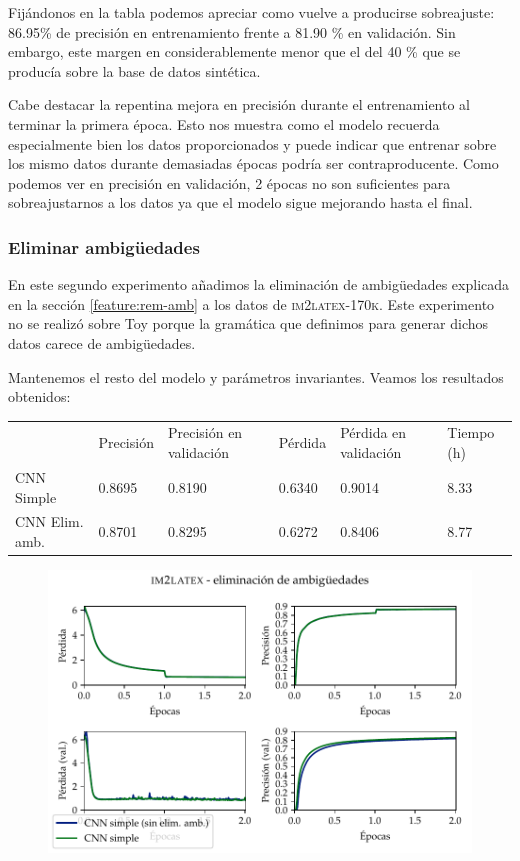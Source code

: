 \documentclass[a4paper, 20pt, dvipsnames]{article}
\begin{document}
Fijándonos en la tabla podemos apreciar como vuelve a producirse sobreajuste:
86.95\% de precisión en entrenamiento frente a 81.90 \% en validación. Sin
embargo, este margen en considerablemente menor que el del 40 \% que se producía
sobre la base de datos sintética.

Cabe destacar la repentina mejora en precisión durante el entrenamiento al
terminar la primera época. Esto nos muestra como el modelo recuerda
especialmente bien los datos proporcionados y puede indicar que entrenar sobre
los mismo datos durante demasiadas épocas podría ser contraproducente. Como
podemos ver en precisión en validación, 2 épocas no son suficientes para
sobreajustarnos a los datos ya que el modelo sigue mejorando hasta el final.

\subsubsection{Eliminar ambigüedades}
\label{exp:2}

En este segundo experimento añadimos la eliminación de ambigüedades explicada en
la sección \ref{feature:rem-amb} a los datos de \textsc{im2latex-170k}. Este experimento no se
realizó sobre Toy porque la gramática que definimos para generar dichos datos
carece de ambigüedades.

Mantenemos el resto del modelo y parámetros invariantes. Veamos los resultados obtenidos:

\begin{table}[H]
	\begin{tabular}{llllll}
		\centering
		& Precisión & Precisión en validación & Pérdida & Pérdida en validación & Tiempo (h) \\ \cline{2-6} 
		CNN Simple       & 0.8695    & 0.8190                  & 0.6340  & 0.9014                & 8.33       \\
		CNN Elim. amb. & 0.8701    & 0.8295                  & 0.6272  & 0.8406                & 8.77      
	\end{tabular}
\end{table}

\begin{figure}[H]
	\centering
	\includegraphics{fig/im2latex-2.pdf}
\end{figure}
\end{document}
